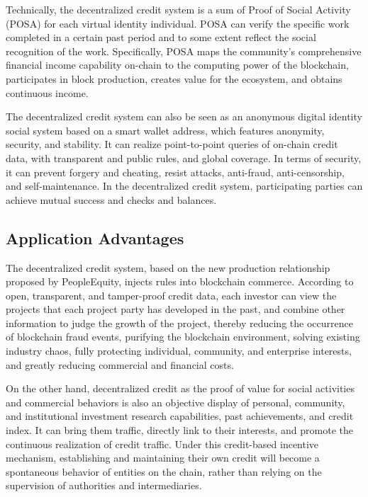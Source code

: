 \documentclass{article}
\begin{document}
Technically, the decentralized credit system is a sum of Proof of Social Activity (POSA) for each virtual identity individual. POSA can verify the specific work completed in a certain past period and to some extent reflect the social recognition of the work. Specifically, POSA maps the community's comprehensive financial income capability on-chain to the computing power of the blockchain, participates in block production, creates value for the ecosystem, and obtains continuous income.

The decentralized credit system can also be seen as an anonymous digital identity social system based on a smart wallet address, which features anonymity, security, and stability. It can realize point-to-point queries of on-chain credit data, with transparent and public rules, and global coverage. In terms of security, it can prevent forgery and cheating, resist attacks, anti-fraud, anti-censorship, and self-maintenance. In the decentralized credit system, participating parties can achieve mutual success and checks and balances.

\subsection{Application Advantages}

The decentralized credit system, based on the new production relationship proposed by PeopleEquity, injects rules into blockchain commerce. According to open, transparent, and tamper-proof credit data, each investor can view the projects that each project party has developed in the past, and combine other information to judge the growth of the project, thereby reducing the occurrence of blockchain fraud events, purifying the blockchain environment, solving existing industry chaos, fully protecting individual, community, and enterprise interests, and greatly reducing commercial and financial costs.

On the other hand, decentralized credit as the proof of value for social activities and commercial behaviors is also an objective display of personal, community, and institutional investment research capabilities, past achievements, and credit index. It can bring them traffic, directly link to their interests, and promote the continuous realization of credit traffic. Under this credit-based incentive mechanism, establishing and maintaining their own credit will become a spontaneous behavior of entities on the chain, rather than relying on the supervision of authorities and intermediaries.
\end{document}
